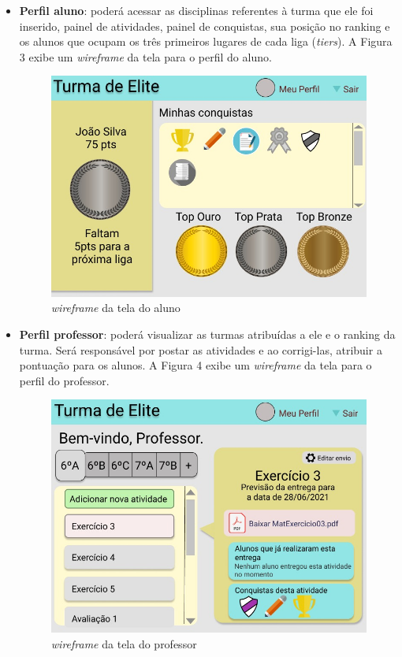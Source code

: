 \begin{itemize}
\item \textbf{Perfil aluno}: poderá acessar as disciplinas referentes à turma que ele foi inserido, painel de atividades, painel de conquistas, sua posição no ranking e os alunos que ocupam os três primeiros lugares de cada liga (\textit{\glspl{tier}}). A Figura 3 exibe um \textit{\gls{wireframe}} da tela para o perfil do aluno.

\begin{figure}[htb]
    \centering
	\includegraphics[width=11cm]{imagens/tela-aluno-2.jpeg}
	\caption{\textit{\gls{wireframe}} da tela do aluno}
\end{figure}
\FloatBarrier

\item \textbf{Perfil professor}: poderá visualizar as turmas atribuídas a ele e o ranking da turma. Será responsável por postar as atividades e ao corrigi-las, atribuir a pontuação para os alunos. A Figura 4 exibe um \textit{\gls{wireframe}} da tela para o perfil do professor.

\begin{figure}[htb]
    \centering
	\includegraphics[width=11cm]{imagens/tela-professor.jpeg}
	\caption{\textit{\gls{wireframe}} da tela do professor}
\end{figure}
\FloatBarrier


\end{itemize}

